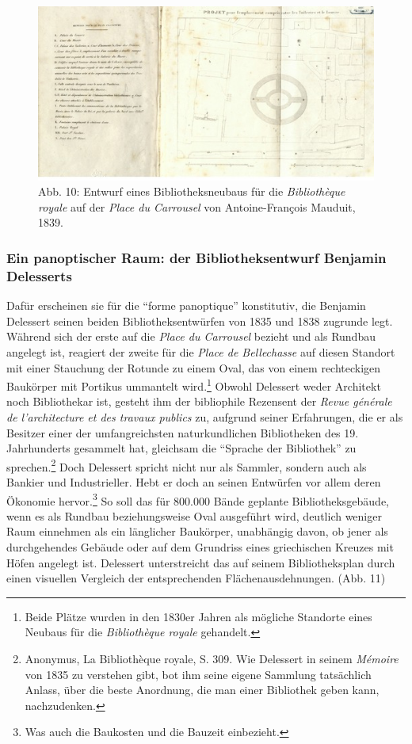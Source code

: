 \begin{figure}[htbp]
\centering
\includegraphics{img/wagner-10.jpg}
\caption*{Abb. 10: Entwurf eines Bibliotheksneubaus für die
\emph{Bibliothèque royale} auf der \emph{Place du Carrousel} von
Antoine-François Mauduit, 1839.}
\end{figure}

\subsubsection{Ein panoptischer Raum: der Bibliotheksentwurf Benjamin
Delesserts}\label{ein-panoptischer-raum-der-bibliotheksentwurf-benjamin-delesserts}

Dafür erscheinen sie für die \enquote{forme panoptique} konstitutiv, die
Benjamin Delessert seinen beiden Bibliotheksentwürfen von 1835 und 1838
zugrunde legt. Während sich der erste auf die \emph{Place du Carrousel}
bezieht und als Rundbau angelegt ist, reagiert der zweite für die
\emph{Place de Bellechasse} auf diesen Standort mit einer Stauchung der
Rotunde zu einem Oval, das von einem rechteckigen Baukörper mit Portikus
ummantelt wird.\footnote{Beide Plätze wurden in den 1830er Jahren als
  mögliche Standorte eines Neubaus für die \emph{Bibliothèque royale}
  gehandelt.} Obwohl Delessert weder Architekt noch Bibliothekar ist,
gesteht ihm der bibliophile Rezensent der \emph{Revue générale de
l'architecture et des travaux publics} zu, aufgrund seiner Erfahrungen,
die er als Besitzer einer der umfangreichsten naturkundlichen
Bibliotheken des 19. Jahrhunderts gesammelt hat, gleichsam die
\enquote{Sprache der Bibliothek} zu sprechen.\footnote{Anonymus, La
  Bibliothèque royale, S. 309. Wie Delessert in seinem \emph{Mémoire}
  von 1835 zu verstehen gibt, bot ihm seine eigene Sammlung tatsächlich
  Anlass, über die beste Anordnung, die man einer Bibliothek geben kann,
  nachzudenken.} Doch Delessert spricht nicht nur als Sammler, sondern
auch als Bankier und Industrieller. Hebt er doch an seinen Entwürfen vor
allem deren Ökonomie hervor.\footnote{Was auch die Baukosten und die
  Bauzeit einbezieht.} So soll das für 800.000 Bände geplante
Bibliotheksgebäude, wenn es als Rundbau beziehungsweise Oval ausgeführt
wird, deutlich weniger Raum einnehmen als ein länglicher Baukörper,
unabhängig davon, ob jener als durchgehendes Gebäude oder auf dem
Grundriss eines griechischen Kreuzes mit Höfen angelegt ist. Delessert
unterstreicht das auf seinem Bibliotheksplan durch einen visuellen
Vergleich der entsprechenden Flächenausdehnungen. (Abb. 11)

